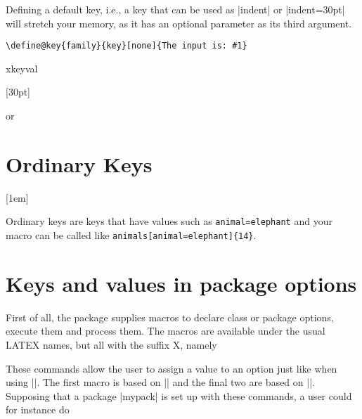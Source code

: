 Defining a default key, i.e., a key that can be used as |indent| or |indent=30pt| will stretch your memory, as it has an optional parameter as its third argument. 

\begin{verbatim}
\define@key{family}{key}[none]{The input is: #1}
\end{verbatim}

\begin{texexample}{xkeyval }{}
\makeatletter

[30pt]{\setlength{\parindent}{#1}}


\lorem

or 

\lorem
\makeatother
\end{texexample}

\section{Ordinary Keys}
\makeatletter
{}[1em]{\setlength{\parindent}{#1}}
\makeatother


Ordinary keys are keys that have values such as \texttt{animal=elephant} and your macro can be called like \texttt{animals[animal=elephant]\{14\}}.

   



\section{Keys and values in package options}

First of all, the package supplies macros to declare class or package options, execute them and process
them. The macros are available under the usual
LATEX names, but all with the suffix X, namely

\begin{macro}{\DeclareOptionX}
\begin{macro}{\DeclareOptionX*}
\begin{macro}{\ExecuteOptionsX}
\begin{macro}{\ProcessOptionsX}
These commands allow the user to assign a value to
an option just like when using |\setkeys|. The first
macro is based on || and the final two
are based on |\setkeys|. Supposing that a package
|mypack| is set up with these commands, a user could
for instance do
\end{macro}
\end{macro}
\end{macro}
\end{macro}

